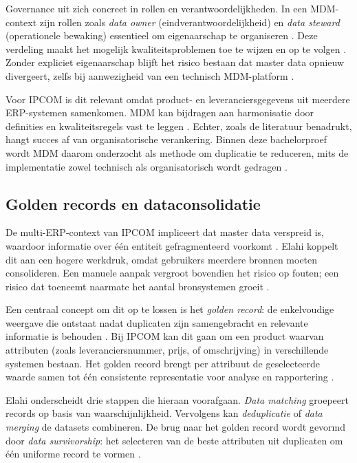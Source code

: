 Governance uit zich concreet in rollen en verantwoordelijkheden. In een MDM-context zijn rollen zoals \emph{data owner} (eindverantwoordelijkheid) en \emph{data steward} (operationele bewaking) essentieel om eigenaarschap te organiseren \autocite{Hikmawati}. Deze verdeling maakt het mogelijk kwaliteitsproblemen toe te wijzen en op te volgen \autocite{VilminkoHeikkinenPekkola2019}. Zonder expliciet eigenaarschap blijft het risico bestaan dat master data opnieuw divergeert, zelfs bij aanwezigheid van een technisch MDM-platform \autocite{VilminkoHeikkinenPekkola2019}.

Voor IPCOM is dit relevant omdat product- en leveranciersgegevens uit meerdere ERP-systemen samenkomen. MDM kan bijdragen aan harmonisatie door definities en kwaliteitsregels vast te leggen \autocite{Hikmawati}. Echter, zoals de literatuur benadrukt, hangt succes af van organisatorische verankering. Binnen deze bachelorproef wordt MDM daarom onderzocht als methode om duplicatie te reduceren, mits de implementatie zowel technisch als organisatorisch wordt gedragen \autocite{Hikmawati}.

\subsection{Golden records en dataconsolidatie}
De multi-ERP-context van IPCOM impliceert dat master data verspreid is, waardoor informatie over één entiteit gefragmenteerd voorkomt \autocite{Elahi}. Elahi koppelt dit aan een hogere werkdruk, omdat gebruikers meerdere bronnen moeten consolideren. Een manuele aanpak vergroot bovendien het risico op fouten; een risico dat toeneemt naarmate het aantal bronsystemen groeit \autocite{Elahi}.

Een centraal concept om dit op te lossen is het \emph{golden record}: de enkelvoudige weergave die ontstaat nadat duplicaten zijn samengebracht en relevante informatie is behouden \autocite{Elahi}. Bij IPCOM kan dit gaan om een product waarvan attributen (zoals leveranciersnummer, prijs, of omschrijving) in verschillende systemen bestaan. Het golden record brengt per attribuut de geselecteerde waarde samen tot één consistente representatie voor analyse en rapportering \autocite{Elahi}.



Elahi onderscheidt drie stappen die hieraan voorafgaan. \emph{Data matching} groepeert records op basis van waarschijnlijkheid. Vervolgens kan \emph{deduplicatie} of \emph{data merging} de datasets combineren. De brug naar het golden record wordt gevormd door \emph{data survivorship}: het selecteren van de beste attributen uit duplicaten om één uniforme record te vormen \autocite{Elahi}.

